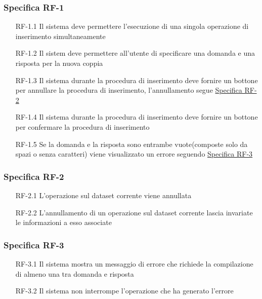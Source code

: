 \subsubsection{Specifica RF-1}
\label{subsubsec:RF-1}
\begin{enumerate}
    \item[RF-1.1] Il sistema deve permettere l'esecuzione di una singola operazione di inserimento simultaneamente
    \item[RF-1.2] Il sistem deve permettere all'utente di specificare una domanda e una risposta per la nuova coppia
    \item[RF-1.3] Il sistema durante la procedura di inserimento deve fornire un bottone per annullare la procedura di inserimento, l'annullamento segue \hyperref[subsubsec:RF-2]{Specifica RF-2}
    \item[RF-1.4] Il sistema durante la procedura di inserimento deve fornire un bottone per confermare la procedura di inserimento
    \item[RF-1.5] Se la domanda e la risposta sono entrambe vuote(composte solo da spazi o senza caratteri) viene visualizzato un errore seguendo \hyperref[subsubsec:RF-3]{Specifica RF-3}
\end{enumerate}

\subsubsection{Specifica RF-2}
\label{subsubsec:RF-2}
\begin{enumerate}
    \item[RF-2.1] L'operazione sul dataset corrente viene annullata
    \item[RF-2.2] L'annullamento di un operazione sul dataset corrente lascia invariate le informazioni a esso associate 
\end{enumerate}

\subsubsection{Specifica RF-3}
\label{subsubsec:RF-3}
\begin{enumerate}
    \item[RF-3.1] Il sistema mostra un messaggio di errore che richiede la compilazione di almeno una tra domanda e risposta
    \item[RF-3.2] Il sistema non interrompe l'operazione che ha generato l'errore 
\end{enumerate}

